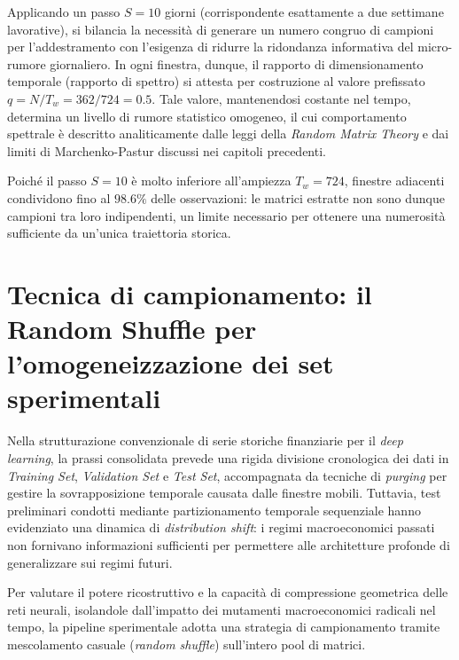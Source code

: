 Applicando un passo $S=10$ giorni (corrispondente esattamente a due settimane lavorative), si bilancia la necessità di generare un numero congruo di campioni per l'addestramento con l'esigenza di ridurre la ridondanza informativa del micro-rumore giornaliero. In ogni finestra, dunque, il rapporto di dimensionamento temporale (rapporto di spettro) si attesta per costruzione al valore prefissato $q = N/T_w = 362/724 = 0.5$. Tale valore, mantenendosi costante nel tempo, determina un livello di rumore statistico omogeneo, il cui comportamento spettrale è descritto analiticamente dalle leggi della \emph{Random Matrix Theory} e dai limiti di Marchenko-Pastur discussi nei capitoli precedenti.

\begin{osservazione}
Poiché il passo $S=10$ è molto inferiore all'ampiezza $T_w=724$, finestre adiacenti condividono fino al $98.6\%$ delle osservazioni: le matrici estratte non sono dunque campioni tra loro indipendenti, un limite necessario per ottenere una numerosità sufficiente da un'unica traiettoria storica.
\end{osservazione}

\section{Tecnica di campionamento: il Random Shuffle per l'omogeneizzazione dei set sperimentali}
\label{sec:purging}

Nella strutturazione convenzionale di serie storiche finanziarie per il \emph{deep learning}, la prassi consolidata prevede una rigida divisione cronologica dei dati in \emph{Training Set}, \emph{Validation Set} e \emph{Test Set}, accompagnata da tecniche di \emph{purging} per gestire la sovrapposizione temporale causata dalle finestre mobili. Tuttavia, test preliminari condotti mediante partizionamento temporale sequenziale hanno evidenziato una dinamica di \emph{distribution shift}: i regimi macroeconomici passati non fornivano informazioni sufficienti per permettere alle architetture profonde di generalizzare sui regimi futuri.

Per valutare il potere ricostruttivo e la capacità di compressione geometrica delle reti neurali, isolandole dall'impatto dei mutamenti macroeconomici radicali nel tempo, la pipeline sperimentale adotta una strategia di campionamento tramite mescolamento casuale (\emph{random shuffle}) sull'intero pool di matrici. 

